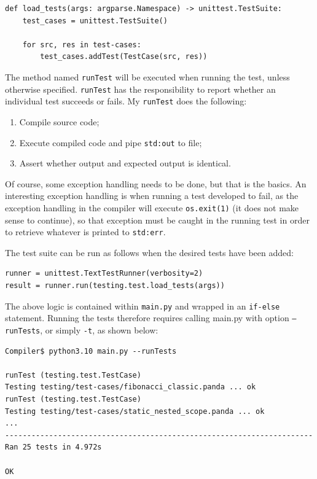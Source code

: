 \begin{verbatim}
def load_tests(args: argparse.Namespace) -> unittest.TestSuite:
    test_cases = unittest.TestSuite()

    for src, res in test-cases:
        test_cases.addTest(TestCase(src, res))
\end{verbatim}

The method named \texttt{runTest} will be executed when running the test, unless otherwise specified. \texttt{runTest} has the responsibility to report whether an individual test succeeds or fails. My \texttt{runTest} does the following:

\begin{enumerate}
    \item Compile source code;
    \item Execute compiled code and pipe \texttt{std:out} to file;
    \item Assert whether output and expected output is identical.
\end{enumerate}

Of course, some exception handling needs to be done, but that is the basics. An interesting exception handling is when running a test developed to fail, as the exception handling in the compiler will execute \texttt{os.exit(1)} (it does not make sense to continue), so that exception must be caught in the running test in order to retrieve whatever is printed to \texttt{std:err}.

The test suite can be run as follows when the desired tests have been added:

\begin{verbatim}
runner = unittest.TextTestRunner(verbosity=2)
result = runner.run(testing.test.load_tests(args))
\end{verbatim}

The above logic is contained within \texttt{main.py} and wrapped in an \texttt{if-else} statement. Running the tests therefore requires calling main.py with option \texttt{--runTests}, or simply \texttt{-t}, as shown below:

\begin{verbatim}
Compiler$ python3.10 main.py --runTests

runTest (testing.test.TestCase)
Testing testing/test-cases/fibonacci_classic.panda ... ok
runTest (testing.test.TestCase)
Testing testing/test-cases/static_nested_scope.panda ... ok
...
----------------------------------------------------------------------
Ran 25 tests in 4.972s

OK 
\end{verbatim}

